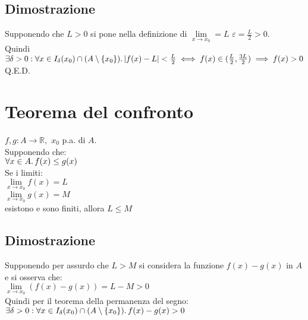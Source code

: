 \documentclass[a4paper, twoside, italian, 11pt]{book}
\newcommand{\braces}[1] {\left \{ #1 \right \}}
\newcommand{\abs}[1] {\left | #1 \right |}
\newcommand{\R}{\mathbb{R}}
\begin{document}
\subsection{Dimostrazione}

\noindent
Supponendo che $L > 0$ si pone nella definizione di $\lim\limits_{x \to x_0} = L$ $\varepsilon = \frac{L}{2} > 0$. \\

\noindent
Quindi $\exists \delta > 0 : \forall x \in I_\delta(x_0) \cap (A \setminus \braces{x_0}) \ldotp \abs{f(x) - L} < \frac{L}{2} \iff f(x) \in (\frac{L}{2}, \frac{3L}{2}) \implies f(x) > 0$ \\

\noindent Q.E.D.


\section{Teorema del confronto}

\noindent
$f, g : A \rightarrow \R,$ $x_0$ p.a. di $A$. \\

\noindent
Supponendo che: \\

$\forall x \in A \ldotp f(x) \leq g(x)$ \\

\noindent
Se i limiti: \\

$\lim\limits_{x \to x_0} f(x) = L$ \\
\indent
$\lim\limits_{x \to x_0} g(x) = M$ \\

\noindent
esistono e sono finiti, allora $L \leq M$


\subsection{Dimostrazione}

\noindent
Supponendo per assurdo che $L > M$ si considera la funzione $f(x) - g(x)$ in $A$ e si osserva che: \\

$\lim\limits_{x \to x_0} (f(x) - g(x)) = L - M > 0$ \\

\noindent
Quindi per il teorema della permanenza del segno: \\

$\exists \delta > 0 : \forall x \in I_\delta(x_0) \cap (A \setminus \braces{x_0}) \ldotp f(x) - g(x) > 0$ \\
\end{document}
